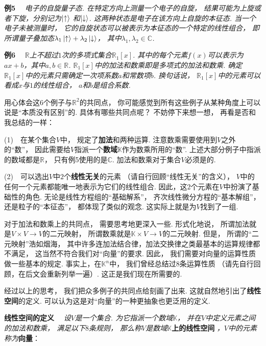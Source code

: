 \textbf{例5}~~
\textit{电子的自旋量子态.
在特定方向上测量一个电子的自旋，
结果可能为上旋或者下旋，分别记为$\ket{\uparrow}$
和$\ket{\downarrow}$.
这两种状态是电子在该方向上自旋的本征态.
当一个电子未被测量时，
它的自旋状态可以被表示为本征态的一个特定的线性组合，
即所谓量子叠加态$\lambda_1 \ket{\uparrow} + \lambda_2 \ket{\downarrow}$，
其中$\lambda_1 , \lambda_2 \in \mathbb{C}$.
}\medskip

\textbf{例6}~~
\textit{$\mathbb{R}$上不超过$1$次的多项式集合$\mathbb{R}_1 [x]$.
其中的每个元素$f(x)$可以表示为$ax + b$，其中$a ,b \in \mathbb{R}$.
$\mathbb{R}_1[x]$中的加法和数乘即是多项式的加法和数乘.
确定$\mathbb{R}_1[x]$中的元素只需确定一次项系数$a$和常数项$b$.
换句话说，
$\mathbb{R}_1[x]$中的元素可以看成$x$与$1$的线性组合，
$a$和$b$是组合系数.
}\medskip

用心体会这$6$个例子与$\mathbb{R}^2$的共同点，
你可能感觉到所有这些例子从某种角度上可以说是“本质没有区别”的.
具体有哪些共同点呢？
不妨停下来想一想，
再看是否和我总结的一样：\medskip

(1)~~在某个集合$V$中，
规定了\textbf{加法}和两种运算.
注意数乘需要使用到$V$之外的“数”，
因此需要给$V$指派一个\textbf{数域}$\mathbb{K}$作为数乘所用的“数”.
上述大部分例子中指派的数域都是$\mathbb{R}$，
只有例5使用的是$\mathbb{C}$.
加法和数乘对于集合$V$必须是的.

(2)~~可以选出$V$中$2$个\textbf{线性无关}的元素
（请自行回顾“线性无关”的含义），
$V$中的任何一个元素都能唯一地表示为它们的线性组合.
因此，这$2$个元素在$V$中扮演了基础性的角色.
无论是线性方程组的“基础解系”，
齐次线性微分方程的“基本解组”，
还是粒子的“本征态”，
都体现了类似的观念.
这实际上就是为$V$找到了一组.\medskip

对于加法和数乘上的共同点，
需要思考地更深入一些.
形式化地说，
所谓加法就是$V \times V \to V$的二元映射，
所谓数乘就是$\mathbb{K} \times V \to V$的二元映射.
但是，
所谓的“二元映射”浩如烟海，
其中许多连加法结合律，加法交换律之类最基本的运算规律都不满足，
这当然不符合我们对“向量”的要求.
因此，
我们需要对向量的运算性质做一些基本的规定.
事实上，在$\mathbb{K}^n$中，
我们曾经总结过$8$条运算性质
（请先自行回顾，在后文会重新列举一遍）.
这正是我们现在所需要的.\medskip

经过以上的思考，
我们把众多例子的共同点给刻画了出来.
这就自然地引出了\textbf{线性空间}的定义.
可以认为这是对“向量”的一种更抽象也更泛用的定义.
\medskip

\textbf{线性空间的定义}~~
\textit{设$V$是一个集合.
为它指派一个数域$\mathbb{K}$，
并在$V$中定义元素之间的加法和数乘，
满足以下$8$条规则，
那么称$V$是数域}\textbf{$\mathbb{K}$上的线性空间}
\textit{，$V$中的元素称为}\textbf{向量}：

